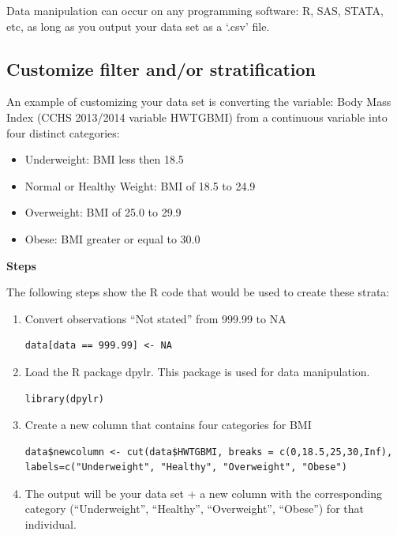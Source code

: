 \documentclass[]{book}
\providecommand{\tightlist}{%
  \setlength{\itemsep}{0pt}\setlength{\parskip}{0pt}}
\begin{document}
Data manipulation can occur on any programming software: R, SAS, STATA,
etc, as long as you output your data set as a `.csv' file.

\subsection{Customize filter and/or
stratification}\label{customize-filter-andor-stratification}

An example of customizing your data set is converting the variable: Body
Mass Index (CCHS 2013/2014 variable HWTGBMI) from a continuous variable
into four distinct categories:

\begin{itemize}
\tightlist
\item
  Underweight: BMI less then 18.5
\item
  Normal or Healthy Weight: BMI of 18.5 to 24.9
\item
  Overweight: BMI of 25.0 to 29.9
\item
  Obese: BMI greater or equal to 30.0
\end{itemize}

\textbf{Steps}

The following steps show the R code that would be used to create these
strata:

\begin{enumerate}
\def\labelenumi{\arabic{enumi}.}
\item
  Convert observations ``Not stated'' from 999.99 to NA

\begin{verbatim}
data[data == 999.99] <- NA
\end{verbatim}
\item
  Load the R package dpylr. This package is used for data manipulation.

\begin{verbatim}
library(dpylr)
\end{verbatim}
\item
  Create a new column that contains four categories for BMI

\begin{verbatim}
data$newcolumn <- cut(data$HWTGBMI, breaks = c(0,18.5,25,30,Inf),  labels=c("Underweight", "Healthy", "Overweight", "Obese")
\end{verbatim}
\item
  The output will be your data set + a new column with the corresponding
  category (``Underweight'', ``Healthy'', ``Overweight'', ``Obese'') for
  that individual.
\end{enumerate}
\end{document}
